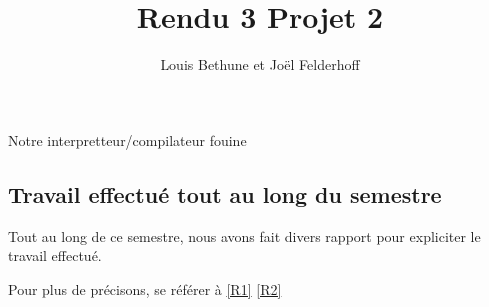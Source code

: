 \documentclass[a4paper,10pt]{report}
\title{Rendu 3 Projet 2}
\author{Louis Bethune et Jo\"el Felderhoff}
\date{}
\begin{document}
\maketitle

\begin{section}{Notre interpretteur/compilateur fouine}

\subsection{Travail effectué tout au long du semestre}
Tout au long de ce semestre, nous avons fait divers rapport pour expliciter le travail effectué.

Pour plus de précisons, se référer à \ref{R1} \ref{R2}

\end{section}
\end{document}
